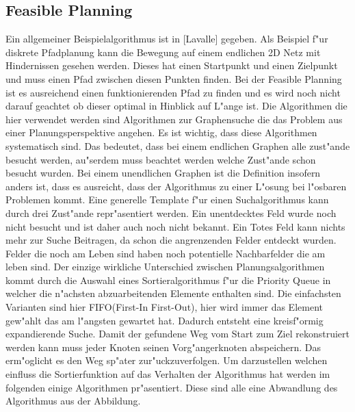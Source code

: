\subsection {Feasible Planning} %
Ein allgemeiner Beispielalgorithmus ist in [Lavalle] gegeben. Als Beispiel f"ur diskrete Pfadplanung kann die Bewegung auf einem endlichen 2D Netz mit Hindernissen gesehen werden. 
Dieses hat einen Startpunkt und einen Zielpunkt und muss einen Pfad zwischen diesen Punkten finden. Bei der Feasible Planning ist es ausreichend einen funktionierenden Pfad zu finden und es wird noch nicht darauf geachtet ob dieser optimal in Hinblick auf L"ange ist.
\newline
Die Algorithmen die hier verwendet werden sind Algorithmen zur Graphensuche die das Problem aus einer Planungsperspektive angehen. Es ist wichtig, dass diese Algorithmen systematisch sind. Das bedeutet, dass bei einem endlichen Graphen alle zust"ande besucht werden, au"serdem muss beachtet werden welche Zust"ande schon besucht wurden. Bei einem unendlichen Graphen ist die Definition insofern anders ist, dass es ausreicht, dass der Algorithmus zu einer L"osung bei l"osbaren Problemen kommt. 
\newline 
Eine generelle Template f"ur einen Suchalgorithmus kann durch drei Zust"ande repr"asentiert werden. 
Ein unentdecktes Feld wurde noch nicht besucht und ist daher auch noch nicht bekannt. Ein Totes Feld kann nichts mehr zur Suche Beitragen, da schon die angrenzenden Felder entdeckt wurden. Felder die noch am Leben sind haben noch potentielle Nachbarfelder die am leben sind.  
\newline
Der einzige wirkliche Unterschied zwischen Planungsalgorithmen kommt durch die Auswahl eines Sortieralgorithmus f"ur die Priority Queue in welcher die n"achsten abzuarbeitenden Elemente enthalten sind. Die einfachsten Varianten sind hier FIFO(First-In First-Out), hier wird immer das Element gew"ahlt das am l"angsten gewartet hat. Dadurch entsteht eine kreisf"ormig expandierende Suche. 
\newline
Damit der gefundene Weg vom Start zum Ziel rekonstruiert werden kann muss jeder Knoten seinen Vorg"angerknoten abspeichern. Das erm"oglicht es den Weg sp"ater zur"uckzuverfolgen. 
\newline
Um darzustellen welchen einfluss die Sortierfunktion auf das Verhalten der Algorithmus hat werden im folgenden einige Algorithmen pr"asentiert.
Diese sind alle eine Abwandlung des Algorithmus aus der Abbildung. 
\newline
\newline
